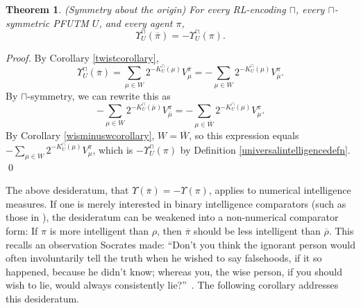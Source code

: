 \documentclass[runningheads]{llncs}
\newtheorem{mytheorem}{Theorem}
\def\LH{\Upsilon}
\begin{document}
\begin{mytheorem}
\label{maintheorem}
(Symmetry about the origin)
    For every RL-encoding $\sqcap$,
    every $\sqcap$-symmetric PFUTM $U$, and every agent $\pi$,
    \[
        \LH^\sqcap_U(\overline\pi) = -\LH^\sqcap_U(\pi).
    \]
\end{mytheorem}

\begin{proof}
    By Corollary \ref{twistcorollary},
    \[
    \LH^\sqcap_U(\overline\pi)=\sum_{\mu\in W} 2^{-K^\sqcap_U(\mu)}V^{\overline\pi}_\mu
    =-\sum_{\mu\in W} 2^{-K^\sqcap_U(\mu)}V^\pi_{\overline\mu}.
    \]
    By $\sqcap$-symmetry, we can rewrite this as
    \[
    -\sum_{\mu\in W} 2^{-K^\sqcap_U(\overline\mu)}V^\pi_{\overline\mu}
    =-\sum_{\mu\in \overline W} 2^{-K^\sqcap_U(\mu)}V^\pi_\mu.
    \]
    By Corollary \ref{wisminuswcorollary}, $W=\overline W$, so this
    expression equals $-\sum_{\mu\in W} 2^{-K^\sqcap_U(\mu)}V^\pi_\mu$,
    which is $-\LH^\sqcap_U(\pi)$ by Definition \ref{universalintelligencedefn}.
    \qed
\end{proof}

The above desideratum, that $\Upsilon(\overline\pi)=-\Upsilon(\pi)$, applies to
numerical intelligence measures. If one is merely interested in binary
intelligence comparators (such as those in \cite{alexander2019intelligence}),
the desideratum can be weakened into a non-numerical comparator form:
    If $\pi$ is more intelligent than $\rho$,
    then $\overline\pi$ should be less intelligent than $\overline\rho$.
This recalls an observation Socrates made:
``Don't you think the ignorant person would often involuntarily
tell the truth when he wished to say falsehoods, if it so happened, because he
didn't know; whereas you, the wise person, if you should wish to lie,
would always consistently lie?''\ \cite{lesserhippias}.
The following corollary addresses this desideratum.
\end{document}
